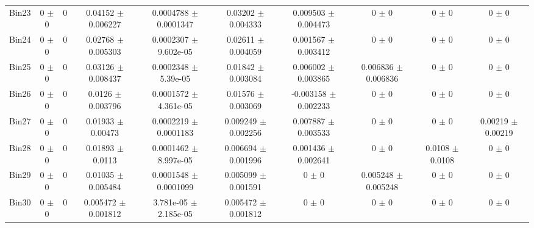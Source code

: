\begin{tabular}{@{\extracolsep{4pt}}lccccccccc@{}}
     Bin23 & 0 $\pm$ 0 & 0 & 0.04152 $\pm$ 0.006227 & 0.0004788 $\pm$ 0.0001347 & 0.03202 $\pm$ 0.004333 & 0.009503 $\pm$ 0.004473 & 0 $\pm$ 0 & 0 $\pm$ 0 & 0 $\pm$ 0 \\ 
     Bin24 & 0 $\pm$ 0 & 0 & 0.02768 $\pm$ 0.005303 & 0.0002307 $\pm$ 9.602e-05 & 0.02611 $\pm$ 0.004059 & 0.001567 $\pm$ 0.003412 & 0 $\pm$ 0 & 0 $\pm$ 0 & 0 $\pm$ 0 \\ 
     Bin25 & 0 $\pm$ 0 & 0 & 0.03126 $\pm$ 0.008437 & 0.0002348 $\pm$ 5.39e-05 & 0.01842 $\pm$ 0.003084 & 0.006002 $\pm$ 0.003865 & 0.006836 $\pm$ 0.006836 & 0 $\pm$ 0 & 0 $\pm$ 0 \\ 
     Bin26 & 0 $\pm$ 0 & 0 & 0.0126 $\pm$ 0.003796 & 0.0001572 $\pm$ 4.361e-05 & 0.01576 $\pm$ 0.003069 & -0.003158 $\pm$ 0.002233 & 0 $\pm$ 0 & 0 $\pm$ 0 & 0 $\pm$ 0 \\ 
     Bin27 & 0 $\pm$ 0 & 0 & 0.01933 $\pm$ 0.00473 & 0.0002219 $\pm$ 0.0001183 & 0.009249 $\pm$ 0.002256 & 0.007887 $\pm$ 0.003533 & 0 $\pm$ 0 & 0 $\pm$ 0 & 0.00219 $\pm$ 0.00219 \\ 
     Bin28 & 0 $\pm$ 0 & 0 & 0.01893 $\pm$ 0.0113 & 0.0001462 $\pm$ 8.997e-05 & 0.006694 $\pm$ 0.001996 & 0.001436 $\pm$ 0.002641 & 0 $\pm$ 0 & 0.0108 $\pm$ 0.0108 & 0 $\pm$ 0 \\ 
     Bin29 & 0 $\pm$ 0 & 0 & 0.01035 $\pm$ 0.005484 & 0.0001548 $\pm$ 0.0001099 & 0.005099 $\pm$ 0.001591 & 0 $\pm$ 0 & 0.005248 $\pm$ 0.005248 & 0 $\pm$ 0 & 0 $\pm$ 0 \\ 
     Bin30 & 0 $\pm$ 0 & 0 & 0.005472 $\pm$ 0.001812 & 3.781e-05 $\pm$ 2.185e-05 & 0.005472 $\pm$ 0.001812 & 0 $\pm$ 0 & 0 $\pm$ 0 & 0 $\pm$ 0 & 0 $\pm$ 0 \\ 
\hline\hline
  \end{tabular}
